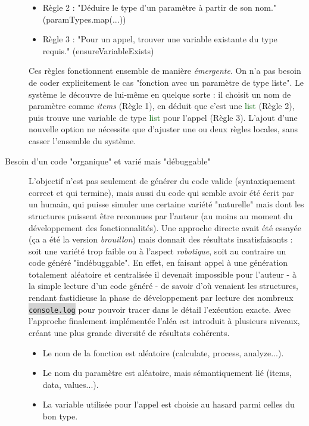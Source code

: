 \documentclass[11pt,a4paper]{article}
\newcommand{\code}[1]{\colorbox{lightgray}{\texttt{\small #1}}}
\newcommand{\var}[1]{\textit{#1}}
\newcommand{\vartype}[1]{\textcolor{darkgreen}{#1}}
\begin{document}
\begin{description}
\begin{itemize}
        \item Règle 2 : "Déduire le type d'un paramètre à partir de son nom." (paramTypes.map(...))
        \item Règle 3 : "Pour un appel, trouver une variable existante du type requis." (ensureVariableExists)
    \end{itemize}
    Ces règles fonctionnent ensemble de manière \textit{émergente}. On n'a pas besoin de coder explicitement le cas "fonction avec un paramètre de type liste". Le système le découvre de lui-même en quelque sorte : il choisit un nom de paramètre comme \var{items} (Règle 1), en déduit que c'est une \vartype{list} (Règle 2), puis trouve une variable de type \vartype{list} pour l'appel (Règle 3). L'ajout d'une nouvelle option ne nécessite que d'ajuster une ou deux règles locales, sans casser l'ensemble du système.

    \item[Besoin d'un code "organique" et varié mais "débuggable"] L'objectif n'est pas seulement de générer du code valide (syntaxiquement correct et qui termine), mais aussi du code qui semble avoir été écrit par un humain, qui puisse simuler une certaine variété "naturelle" mais dont les structures puissent être reconnues par l'auteur (au moins au moment du développement des fonctionnalités). Une approche directe avait été essayée (ça a été la version \textit{brouillon}) mais donnait des résultats insatisfaisants : soit une variété trop faible ou à l'aspect \textit{robotique}, soit au contraire un code généré "indébuggable". En effet, en faisant appel à une génération totalement aléatoire et centralisée il devenait impossible pour l'auteur - à la simple lecture d'un code généré - de savoir d'où venaient les structures, rendant fastidieuse la phase de développement par lecture des nombreux \code{console.log} pour pouvoir tracer dans le détail l'exécution exacte. Avec l'approche finalement implémentée l'aléa est introduit à plusieurs niveaux, créant une plus grande diversité de résultats cohérents.
    \begin{itemize}
        \item Le nom de la fonction est aléatoire (calculate, process, analyze...).
        \item Le nom du paramètre est aléatoire, mais sémantiquement lié (items, data, values...).
        \item La variable utilisée pour l'appel est choisie au hasard parmi celles du bon type.
    \end{itemize}
\end{description}
\end{document}
